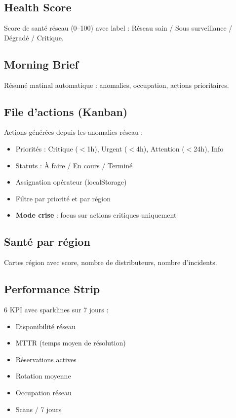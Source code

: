 \documentclass[11pt,a4paper]{article}
\begin{document}
\subsection{Health Score}
Score de santé réseau (0--100) avec label : Réseau sain / Sous surveillance / Dégradé / Critique.

\subsection{Morning Brief}
Résumé matinal automatique : anomalies, occupation, actions prioritaires.

\subsection{File d'actions (Kanban)}
Actions générées depuis les anomalies réseau :
\begin{itemize}[noitemsep]
  \item Priorités : Critique ($<$1h), Urgent ($<$4h), Attention ($<$24h), Info
  \item Statuts : À faire / En cours / Terminé
  \item Assignation opérateur (localStorage)
  \item Filtre par priorité et par région
  \item \textbf{Mode crise} : focus sur actions critiques uniquement
\end{itemize}

\subsection{Santé par région}
Cartes région avec score, nombre de distributeurs, nombre d'incidents.

\subsection{Performance Strip}
6 KPI avec sparklines sur 7 jours :
\begin{itemize}[noitemsep]
  \item Disponibilité réseau
  \item MTTR (temps moyen de résolution)
  \item Réservations actives
  \item Rotation moyenne
  \item Occupation réseau
  \item Scans / 7 jours
\end{itemize}
\end{document}
